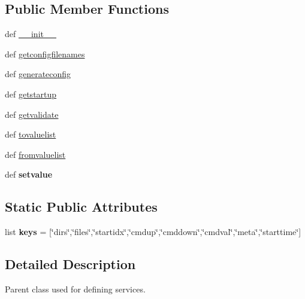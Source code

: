 \subsection*{Public Member Functions}
\begin{DoxyCompactItemize}
\item 
def \hyperlink{classcore_1_1service_1_1_core_service_a4023927c044788e869dc76d6618af267}{\+\_\+\+\_\+init\+\_\+\+\_\+}
\item 
def \hyperlink{classcore_1_1service_1_1_core_service_a1e2b99c6402a165d0ddf75d9cb533b1e}{getconfigfilenames}
\item 
def \hyperlink{classcore_1_1service_1_1_core_service_a97b07f847f10d791d6a55840e4cff247}{generateconfig}
\item 
def \hyperlink{classcore_1_1service_1_1_core_service_ac5b0ecec44e5985666806dd64dfe5140}{getstartup}
\item 
def \hyperlink{classcore_1_1service_1_1_core_service_a645cc4a2e83d659de8554422e16e04bb}{getvalidate}
\item 
def \hyperlink{classcore_1_1service_1_1_core_service_a5ed4b3d294be9a9c9e3ff6c17781165c}{tovaluelist}
\item 
def \hyperlink{classcore_1_1service_1_1_core_service_a4ae30edbcadcd50b114b6ab1bfa425ac}{fromvaluelist}
\item 
\hypertarget{classcore_1_1service_1_1_core_service_aec68542a31e90a94ec7b706d9e17c541}{def {\bfseries setvalue}}\label{classcore_1_1service_1_1_core_service_aec68542a31e90a94ec7b706d9e17c541}

\end{DoxyCompactItemize}
\subsection*{Static Public Attributes}
\begin{DoxyCompactItemize}
\item 
\hypertarget{classcore_1_1service_1_1_core_service_acb8c8bbfa5906ee8371c5ba6be1f9aa0}{list {\bfseries keys} = \mbox{[}\char`\"{}dirs\char`\"{},\char`\"{}files\char`\"{},\char`\"{}startidx\char`\"{},\char`\"{}cmdup\char`\"{},\char`\"{}cmddown\char`\"{},\char`\"{}cmdval\char`\"{},\char`\"{}meta\char`\"{},\char`\"{}starttime\char`\"{}\mbox{]}}\label{classcore_1_1service_1_1_core_service_acb8c8bbfa5906ee8371c5ba6be1f9aa0}

\end{DoxyCompactItemize}


\subsection{Detailed Description}
\begin{DoxyVerb}Parent class used for defining services.
\end{DoxyVerb}
 

